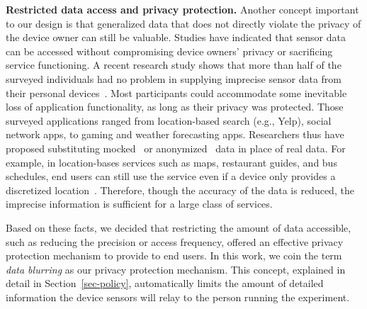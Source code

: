 \textbf{Restricted data access and privacy protection.}
Another concept important to our design is that generalized data that 
does not directly violate the privacy of the device owner can still be 
valuable. Studies have indicated that 
sensor data can be accessed without compromising device 
owners' privacy or sacrificing service functioning.
A recent research study shows that more than half of the 
surveyed individuals had no problem in supplying imprecise 
sensor data from their personal devices~\cite{fawaz2014location}. 
Most participants could accommodate some inevitable loss of application 
functionality, as long as their privacy was protected. Those surveyed
applications ranged from location-based search (e.g., Yelp), social 
network apps, to gaming and weather forecasting apps. 
Researchers thus have proposed 
substituting mocked~\cite{beresford2011mockdroid} or 
anonymized~\cite{zhou2011taming} data in place of real data. 
For example, in location-bases services such as maps, 
restaurant guides, and bus schedules, end users can still use the 
service even if a device only provides a discretized 
location~\cite{amini2011cache, krumm2007inference}. Therefore, 
though the accuracy of the data is reduced, 
the imprecise information is sufficient for a large class of services. 

Based on these facts, we decided that restricting 
the amount of data accessible, such as reducing the precision or 
access frequency, offered an effective privacy protection mechanism to 
provide to end users. In this work, we coin the term \textit{data blurring}
as our privacy protection mechanism. This concept, explained in detail in
Section~\ref{sec-policy}, automatically limits the amount of detailed 
information the device sensors will relay to the person running the 
experiment.

